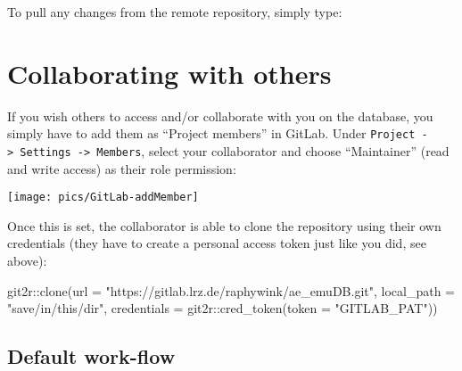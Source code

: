 \documentclass[
]{book}
\newenvironment{Shaded}{\begin{snugshade}}{\end{snugshade}}
\newcommand{\AttributeTok}[1]{\textcolor[rgb]{0.77,0.63,0.00}{#1}}
\newcommand{\FunctionTok}[1]{\textcolor[rgb]{0.00,0.00,0.00}{#1}}
\newcommand{\NormalTok}[1]{#1}
\newcommand{\SpecialCharTok}[1]{\textcolor[rgb]{0.00,0.00,0.00}{#1}}
\newcommand{\StringTok}[1]{\textcolor[rgb]{0.31,0.60,0.02}{#1}}
\begin{document}
To pull any changes from the remote repository, simply type:

\begin{Shaded}
\end{Shaded}

\hypertarget{collaborating-with-others}{%
\section{Collaborating with others}\label{collaborating-with-others}}

If you wish others to access and/or collaborate with you on the database, you simply have to add them as ``Project members'' in GitLab. Under \texttt{Project\ -\textgreater{}\ Settings\ -\textgreater{}\ Members}, select your collaborator and choose ``Maintainer'' (read and write access) as their role permission:

\begin{center}\texttt{[image: pics/GitLab-addMember]} \end{center}

Once this is set, the collaborator is able to clone the repository using their own credentials (they have to create a personal access token just like you did, see above):

\begin{Shaded}
\begin{Highlighting}[]
\NormalTok{git2r}\SpecialCharTok{::}\FunctionTok{clone}\NormalTok{(}\AttributeTok{url =} \StringTok{"https://gitlab.lrz.de/raphywink/ae\_emuDB.git"}\NormalTok{,}
             \AttributeTok{local\_path =} \StringTok{"save/in/this/dir"}\NormalTok{,}
             \AttributeTok{credentials =}\NormalTok{ git2r}\SpecialCharTok{::}\FunctionTok{cred\_token}\NormalTok{(}\AttributeTok{token =} \StringTok{"GITLAB\_PAT"}\NormalTok{))}
\end{Highlighting}
\end{Shaded}

\hypertarget{default-work-flow}{%
\subsection{Default work-flow}\label{default-work-flow}}
\end{document}
